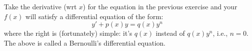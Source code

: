   Take the derivative (wrt $x$) for the equation in the previous exercise
  and your $f(x)$ will satisfy a differential equation of the form:
  \[
    y' + p(x) y = q(x) y^n
  \]
  where the right is (fortunately) simple: it's $q(x)$ instead of $q(x)y^n$, i.e., $n = 0$.
  The above is called a Bernoulli's differential equation.
